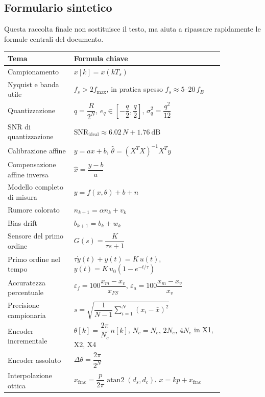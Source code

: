 \documentclass[11pt,a4paper]{article}
\begin{document}
\subsection*{Formulario sintetico}

Questa raccolta finale non sostituisce il testo, ma aiuta a ripassare rapidamente le formule centrali del documento.

{\renewcommand{\arraystretch}{1.18}
\begin{longtable}{>{\raggedright\arraybackslash}p{0.24\linewidth}>{\raggedright\arraybackslash}p{0.60\linewidth}}
\toprule
\textbf{Tema} & \textbf{Formula chiave} \\
\midrule
Campionamento & $x[k]=x(kT_s)$ \\
Nyquist e banda utile & $f_s>2f_{\max}$, \quad in pratica spesso $f_s\approx 5\text{--}20\,f_B$ \\
Quantizzazione & $q=\dfrac{R}{2^N}$, \quad $e_q\in\left[-\dfrac{q}{2},\dfrac{q}{2}\right]$, \quad $\sigma_q^2=\dfrac{q^2}{12}$ \\
SNR di quantizzazione & $\text{SNR}_{\text{ideal}}\approx 6.02\,N+1.76\ \text{dB}$ \\
Calibrazione affine & $y=ax+b$, \quad $\hat\theta=(X^TX)^{-1}X^Ty$ \\
Compensazione affine inversa & $\hat x=\dfrac{y-b}{a}$ \\
Modello completo di misura & $y=f(x,\theta)+b+n$ \\
Rumore colorato & $n_{k+1}=\alpha n_k+v_k$ \\
Bias drift & $b_{k+1}=b_k+w_k$ \\
Sensore del primo ordine & $G(s)=\dfrac{K}{\tau s+1}$ \\
Primo ordine nel tempo & $\tau \dot y(t)+y(t)=K\,u(t)$, \quad $y(t)=K\,u_0\left(1-e^{-t/\tau}\right)$ \\
Accuratezza percentuale & $\varepsilon_f=100\dfrac{x_m-x_v}{x_{FS}}$, \quad $\varepsilon_a=100\dfrac{x_m-x_v}{x_v}$ \\
Precisione campionaria & $s=\sqrt{\dfrac{1}{N-1}\sum_{i=1}^{N}(x_i-\bar x)^2}$ \\
Encoder incrementale & $\theta[k]=\dfrac{2\pi}{N_c}\,n[k]$, \quad $N_c=N_e,\,2N_e,\,4N_e$ in X1, X2, X4 \\
Encoder assoluto & $\Delta\theta=\dfrac{2\pi}{2^N}$ \\
Interpolazione ottica & $x_{\text{frac}}=\dfrac{p}{2\pi}\operatorname{atan2}(d_s,d_c)$, \quad $x=kp+x_{\text{frac}}$ \\

\end{longtable}}
\end{document}
